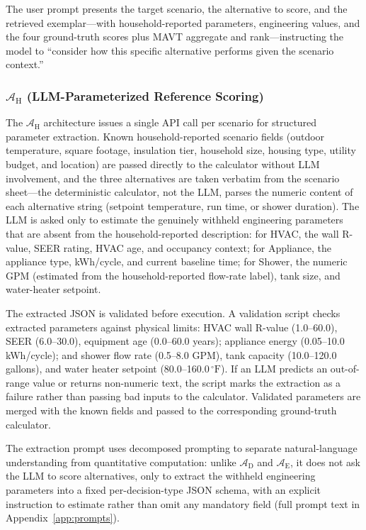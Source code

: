 \documentclass[final,3p,times]{elsarticle}
\begin{document}
\vspace{0.3em}

\noindent The user prompt presents the target scenario, the alternative to score, and the retrieved exemplar---with household-reported parameters, engineering values, and the four ground-truth scores plus MAVT aggregate and rank---instructing the model to ``consider how this specific alternative performs given the scenario context.'' 

\subsubsection{\texorpdfstring{$\mathcal{A}_{\text{H}}$}{A_H} (LLM-Parameterized Reference Scoring)}
The $\mathcal{A}_{\text{H}}$ architecture issues a single API call per scenario for structured parameter extraction. Known household-reported scenario fields (outdoor temperature, square footage, insulation tier, household size, housing type, utility budget, and location) are passed directly to the calculator without LLM involvement, and the three alternatives are taken verbatim from the scenario sheet---the deterministic calculator, not the LLM, parses the numeric content of each alternative string (setpoint temperature, run time, or shower duration). The LLM is asked only to estimate the genuinely withheld engineering parameters that are absent from the household-reported description: for HVAC, the wall R-value, SEER rating, HVAC age, and occupancy context; for Appliance, the appliance type, kWh/cycle, and current baseline time; for Shower, the numeric GPM (estimated from the household-reported flow-rate label), tank size, and water-heater setpoint.

The extracted JSON is validated before execution. A validation script checks extracted parameters against physical limits: HVAC wall R-value (1.0--60.0), SEER (6.0--30.0), equipment age (0.0--60.0 years); appliance energy (0.05--10.0 kWh/cycle); and shower flow rate (0.5--8.0 GPM), tank capacity (10.0--120.0 gallons), and water heater setpoint (80.0--160.0\,$^\circ\text{F}$). If an LLM predicts an out-of-range value or returns non-numeric text, the script marks the extraction as a failure rather than passing bad inputs to the calculator. Validated parameters are merged with the known fields and passed to the corresponding ground-truth calculator.

The extraction prompt uses decomposed prompting \cite{khot2023} to separate natural-language understanding from quantitative computation: unlike $\mathcal{A}_{\text{D}}$ and $\mathcal{A}_{\text{E}}$, it does not ask the LLM to score alternatives, only to extract the withheld engineering parameters into a fixed per-decision-type JSON schema, with an explicit instruction to estimate rather than omit any mandatory field (full prompt text in Appendix~\ref{app:prompts}).
\end{document}
